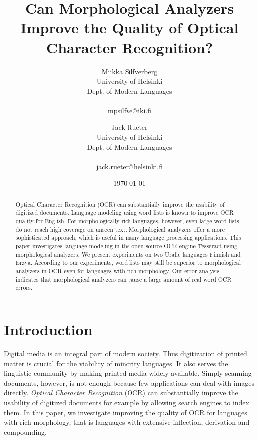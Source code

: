 \documentclass[b5paper]{article}
\begin{document}
\title{Can Morphological Analyzers Improve the Quality of Optical Character Recognition?}

\author{Miikka Silfverberg\\
University of Helsinki\\
Dept. of Modern Languages\\
\\
\url{mpsilfve@iki.fi} \and
Jack Rueter\\
University of Helsinki\\
Dept. of Modern Languages\\
\\
\url{jack.rueter@helsinki.fi} 
}

\date{\today}

\maketitle

\begin{abstract}
\noindent Optical Character Recognition (OCR) can substantially improve
  the usability of digitized documents. Language modeling using word
  lists is known to improve OCR quality for English. For
  morphologically rich languages, however, even large word lists do not reach
  high coverage on unseen text. Morphological analyzers offer a more
  sophisticated approach, which is useful in many language processing
  applications. This paper investigates language modeling in the
  open-source OCR engine Tesseract using morphological analyzers. We
  present experiments on two Uralic languages Finnish and
  Erzya. According to our experiments, word lists may still be
  superior to morphological analyzers in OCR even for languages with
  rich morphology. Our error analysis indicates that morphological
  analyzers can cause a large amount of real word OCR errors.
\end{abstract}

\section{Introduction}

Digital media is an integral part of modern society. Thus digitization
of printed matter is crucial for the viability of minority languages. It
also serves the linguistic community by making printed media widely
available. Simply scanning documents, however, is not enough because
few applications can deal with images directly. {\it Optical Character
  Recognition} (OCR) can substantially improve the usability of
digitized documents for example by allowing search engines to index
them. In this paper, we investigate improving the quality of OCR for
languages with rich morphology, that is languages with extensive
inflection, derivation and compounding.
\end{document}
